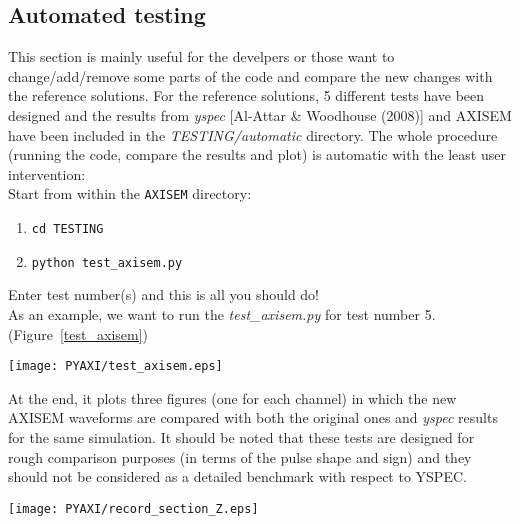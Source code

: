 \subsection{Automated testing}

This section is mainly useful for the develpers or those want to change/add/remove some parts of the code and compare the new changes with the reference solutions.
For the reference solutions, 5 different tests have been designed and 
the results from \textit{yspec} [Al-Attar \& Woodhouse (2008)] and AXISEM have been included in the \textit{TESTING/automatic} directory.
The whole procedure (running the code, compare the results and plot) is automatic with the least user intervention: \\

Start from within the {\tt AXISEM} directory:
 \begin{enumerate}
 \itemsep0em
 \item {\tt cd TESTING}
 \item {\tt python test\_axisem.py}
 \end{enumerate}

Enter test number(s) and this is all you should do! \\

\noindent As an example, we want to run the \textit{test\_axisem.py} for test number 5. (Figure~\ref{test_axisem})

\begin{figure*}[htb]
\begin{center}
\texttt{[image: PYAXI/test\_axisem.eps]}
\caption{\textit{Screenshot while running test\_axisem.py}}
\end{center}
\label{test_axisem}
\end{figure*}

\noindent At the end, it plots three figures (one for each channel) 
in which the new AXISEM waveforms are compared with both the original ones and \textit{yspec} results for the same simulation.
It should be noted that these tests are designed for rough comparison purposes (in terms of the pulse shape and sign) and they should not be considered as a detailed benchmark with respect to YSPEC. \\

\begin{figure*}[htb]
\begin{center}
\texttt{[image: PYAXI/record\_section\_Z.eps]}
\caption{\textit{Comparing new AXISEM results with the reference solution and \textit{yspec} waveforms. (Z channel)}}
\end{center}
\label{channel_Z}
\end{figure*}

